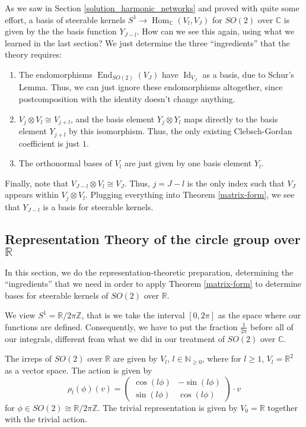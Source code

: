 \documentclass[12pt, a4paper]{article}
\theoremstyle{plain}
\theoremstyle{definition}
\theoremstyle{remark}
\newcommand{\N}{\mathds{N}}
\newcommand{\Z}{\mathds{Z}}
\newcommand{\R}{\mathds{R}}
\newcommand{\C}{\mathds{C}}
\DeclareMathOperator{\End}{End}
\DeclareMathOperator{\Hom}{Hom}
\DeclareMathOperator{\Id}{Id}
\begin{document}
As we saw in Section \ref{solution_harmonic_networks} and proved with quite some effort, a basis of steerable kernels $S^1 \to \Hom_{\C}(V_l, V_J)$ for $SO(2)$ over $\C$ is given by the the basis function $Y_{J-l}$. How can we see this again, using what we learned in the last section? We just determine the three ``ingredients'' that the theory requires:
\begin{enumerate}
\item The endomorphisms $\End_{SO(2)}(V_J)$ have $\Id_{V_J}$ as a basis, due to Schur's Lemma. Thus, we can just ignore these endomorphisms altogether, since postcomposition with the identity doesn't change anything.
\item $V_j \otimes V_l \cong V_{j+l}$, and the basis element $Y_j \otimes Y_l$ maps directly to the basis element $Y_{j+l}$ by this isomorphism. Thus, the only existing Clebsch-Gordan coefficient is just $1$.
\item The orthonormal bases of $V_l$ are just given by one basis element $Y_l$.
\end{enumerate}
Finally, note that $V_{J-l} \otimes V_l \cong V_J$. Thus, $j = J-l$ is the only index such that $V_J$ appears within $V_j \otimes V_l$. Plugging everything into Theorem \ref{matrix-form}, we see that $Y_{J-l}$ is a basis for steerable kernels.



\subsection{Representation Theory of the circle group over $\R$}

In this section, we do the representation-theoretic preparation, determining the ``ingredients'' that we need in order to apply Theorem \ref{matrix-form} to determine bases for steerable kernels of $SO(2)$ over $\R$. 

We view $S^1 = \R/{2 \pi \Z}$, that is we take the interval $[0, 2 \pi]$ as the space where our functions are defined. Consequently, we have to put the fraction $\frac{1}{2 \pi}$ before all of our integrals, different from what we did in our treatment of $SO(2)$ over $\C$.

The irreps of $SO(2)$ over $\R$ are given by $V_l$, $l \in \N_{\geq 0}$, where for $l \geq 1$, $V_l = \R^2$ as a vector space. The action is given by
\begin{equation*}
\rho_l(\phi)(v) =
\begin{pmatrix}
\cos(l \phi) & -\sin(l \phi) \\
\sin(l \phi) & \cos(l \phi)
\end{pmatrix} \cdot v
\end{equation*}
for $\phi \in SO(2) \cong \R/{2 \pi \Z}$. The trivial representation is given by $V_0 = \R$ together with the trivial action.
\end{document}

